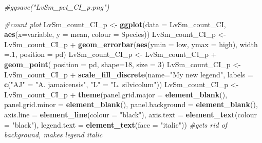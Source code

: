 \documentclass[]{article}
\newenvironment{Shaded}{\begin{snugshade}}{\end{snugshade}}
\newcommand{\KeywordTok}[1]{\textcolor[rgb]{0.13,0.29,0.53}{\textbf{{#1}}}}
\newcommand{\DataTypeTok}[1]{\textcolor[rgb]{0.13,0.29,0.53}{{#1}}}
\newcommand{\DecValTok}[1]{\textcolor[rgb]{0.00,0.00,0.81}{{#1}}}
\newcommand{\StringTok}[1]{\textcolor[rgb]{0.31,0.60,0.02}{{#1}}}
\newcommand{\CommentTok}[1]{\textcolor[rgb]{0.56,0.35,0.01}{\textit{{#1}}}}
\newcommand{\NormalTok}[1]{{#1}}
\begin{document}
\begin{Shaded}
\begin{Highlighting}[]
\CommentTok{#ggsave("LvSm_pct_CI_p.png")}

\CommentTok{#count plot}
\NormalTok{LvSm_count_CI_p <-}\StringTok{ }\KeywordTok{ggplot}\NormalTok{(}\DataTypeTok{data =} \NormalTok{LvSm_count_CI, }\KeywordTok{aes}\NormalTok{(}\DataTypeTok{x=}\NormalTok{variable, }\DataTypeTok{y =} \NormalTok{mean, }\DataTypeTok{colour =} \NormalTok{Species))}
\NormalTok{LvSm_count_CI_p <-}\StringTok{ }\NormalTok{LvSm_count_CI_p +}\StringTok{ }\KeywordTok{geom_errorbar}\NormalTok{(}\KeywordTok{aes}\NormalTok{(}\DataTypeTok{ymin =} \NormalTok{low, }\DataTypeTok{ymax =} \NormalTok{high), }\DataTypeTok{width =}\NormalTok{.}\DecValTok{1}\NormalTok{, }\DataTypeTok{position =} \NormalTok{pd)}
\NormalTok{LvSm_count_CI_p <-}\StringTok{ }\NormalTok{LvSm_count_CI_p +}\StringTok{ }\KeywordTok{geom_point}\NormalTok{( }\DataTypeTok{position =} \NormalTok{pd, }\DataTypeTok{shape=}\DecValTok{18}\NormalTok{, }\DataTypeTok{size =} \DecValTok{3}\NormalTok{)}
\NormalTok{LvSm_count_CI_p <-}\StringTok{ }\NormalTok{LvSm_count_CI_p +}\StringTok{ }\KeywordTok{scale_fill_discrete}\NormalTok{(}\DataTypeTok{name=}\StringTok{"My new legend"}\NormalTok{, }\DataTypeTok{labels =} \KeywordTok{c}\NormalTok{(}\StringTok{"AJ"} \NormalTok{=}\StringTok{ "A. jamaicensis"}\NormalTok{, }\StringTok{"L"} \NormalTok{=}\StringTok{ "L. silvicolum"}\NormalTok{)) }
\NormalTok{LvSm_count_CI_p <-}\StringTok{ }\NormalTok{LvSm_count_CI_p +}\StringTok{ }\KeywordTok{theme}\NormalTok{(}\DataTypeTok{panel.grid.major =} \KeywordTok{element_blank}\NormalTok{(), }\DataTypeTok{panel.grid.minor =} \KeywordTok{element_blank}\NormalTok{(),}
\DataTypeTok{panel.background =} \KeywordTok{element_blank}\NormalTok{(), }\DataTypeTok{axis.line =} \KeywordTok{element_line}\NormalTok{(}\DataTypeTok{colour =} \StringTok{"black"}\NormalTok{), }\DataTypeTok{axis.text =} \KeywordTok{element_text}\NormalTok{(}\DataTypeTok{colour =} \StringTok{"black"}\NormalTok{), }\DataTypeTok{legend.text =} \KeywordTok{element_text}\NormalTok{(}\DataTypeTok{face =} \StringTok{"italic"}\NormalTok{))  }\CommentTok{#gets rid of background, makes legend italic}


\end{Highlighting}
\end{Shaded}
\end{document}
